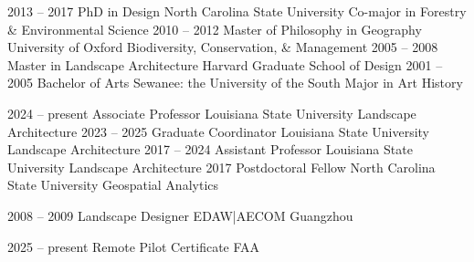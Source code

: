 \documentclass[10pt]{designcv}
\begin{document}
\begin{entrylist}
	\entry
		{2013 -- 2017}
		{PhD in Design}
		{North Carolina State University}
		{Co-major in Forestry \& Environmental Science}
	\entry
		{2010 -- 2012}
		{Master of Philosophy in Geography} %
		{University of Oxford}
		{Biodiversity, Conservation, \& Management}
	\entry
		{2005 -- 2008}
		{Master in Landscape Architecture}
		{Harvard Graduate School of Design}
		{\vspace*{-1em}}
	\entry
		{2001 -- 2005}
		{Bachelor of Arts}
		{Sewanee: the University of the South}
		{Major in Art History}
\end{entrylist}




\begin{entrylist}
	\entry
		{2024 -- present}
		{Associate Professor}
		{Louisiana State University}
		{Landscape Architecture}
	\entry
		{2023 -- 2025}
		{Graduate Coordinator}
		{Louisiana State University}
		{Landscape Architecture}
	\entry
		{2017 -- 2024}
		{Assistant Professor}
		{Louisiana State University}
		{Landscape Architecture}
	\entry
		{2017}
		{Postdoctoral Fellow}
		{North Carolina State University}
		{Geospatial Analytics}
\end{entrylist}


\begin{entrylist}
	\entry
		{2008 -- 2009}
		{Landscape Designer}
		{EDAW|AECOM Guangzhou}
		{}
\end{entrylist}


\begin{entrylist}
	\entry
		{2025 -- present}
		{Remote Pilot Certificate}
		{FAA}
		{}
\end{entrylist}


\nocite{*}
\setlength\bibitemsep{0.75em}

\printbibliography[title={\cvsect{Books}\vspace*{-2em}}, type=book, heading=subbibliography]
\end{document}
